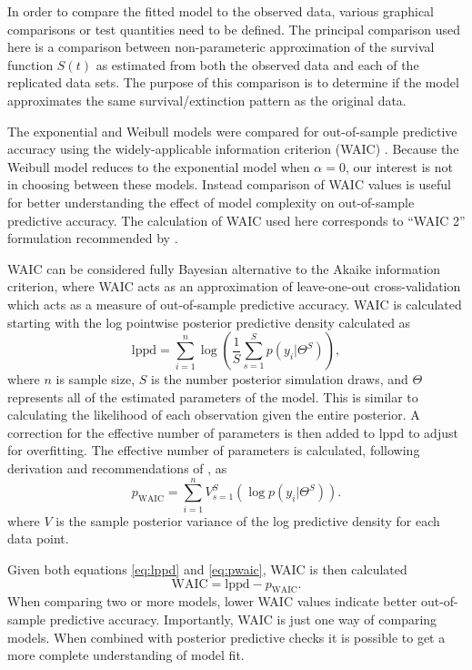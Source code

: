 \documentclass[12pt,letterpaper]{article}
\begin{document}
In order to compare the fitted model to the observed data, various graphical comparisons or test quantities need to be defined. The principal comparison used here is a comparison between non-parameteric approximation of the survival function \(S(t)\) as estimated from both the observed data and each of the replicated data sets. The purpose of this comparison is to determine if the model approximates the same survival/extinction pattern as the original data. 

The exponential and Weibull models were compared for out-of-sample predictive accuracy using the widely-applicable information criterion (WAIC) \citep{Watanabe2010a}. Because the Weibull model reduces to the exponential model when \(\alpha = 0\), our interest is not in choosing between these models. Instead comparison of WAIC values is useful for better understanding the effect of model complexity on out-of-sample predictive accuracy. The calculation of WAIC used here corresponds to ``WAIC 2'' formulation recommended by \citet{Gelman2013d}.

WAIC can be considered fully Bayesian alternative to the Akaike information criterion, where WAIC acts as an approximation of leave-one-out cross-validation which acts as a measure of out-of-sample predictive accuracy. WAIC is calculated starting with the log pointwise posterior predictive density calculated as
\begin{equation}
  \mathrm{lppd} = \sum_{i = 1}^{n} \log \left(\frac{1}{S} \sum_{s = 1}^{S} p(y_{i}|\Theta^{S})\right),
  \label{eq:lppd}
\end{equation}
where \(n\) is sample size, \(S\) is the number posterior simulation draws, and \(\Theta\) represents all of the estimated parameters of the model. This is similar to calculating the likelihood of each observation given the entire posterior. A correction for the effective number of parameters is then added to lppd to adjust for overfitting. The effective number of parameters is calculated, following derivation and recommendations of \citep{Gelman2013d}, as
\begin{equation}
  p_{\mathrm{WAIC}} = \sum_{i = 1}^{n} V_{s = 1}^{S} (\log p(y_{i}|\Theta^{S})).
  \label{eq:pwaic}
\end{equation}
where \(V\) is the sample posterior variance of the log predictive density for each data point.

Given both equations \ref{eq:lppd} and \ref{eq:pwaic}, WAIC is then calculated
\begin{equation}
  \mathrm{WAIC} = \mathrm{lppd} - p_{\mathrm{WAIC}}.
  \label{eq:waic}
\end{equation}
When comparing two or more models, lower WAIC values indicate better out-of-sample predictive accuracy. Importantly, WAIC is just one way of comparing models. When combined with posterior predictive checks it is possible to get a more complete understanding of model fit.
\end{document}
